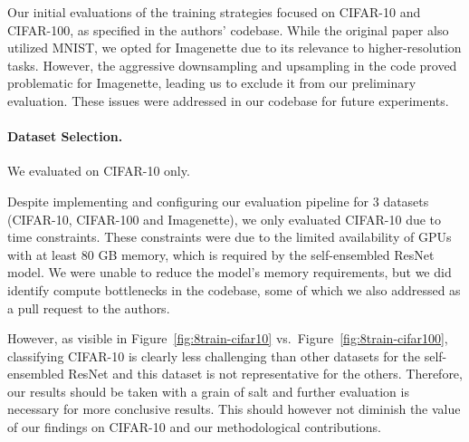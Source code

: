 \documentclass[a4paper, oneside]{discothesis}
\begin{document}
Our initial evaluations of the training strategies focused on CIFAR-10 and CIFAR-100, as specified in the authors' codebase. While the original paper also utilized MNIST, we opted for Imagenette due to its relevance to higher-resolution tasks. However, the aggressive downsampling and upsampling in the code proved problematic for Imagenette, leading us to exclude it from our preliminary evaluation. These issues were addressed in our codebase for future experiments.

\paragraph{Dataset Selection.}

We evaluated on CIFAR-10 only.

Despite implementing and configuring our evaluation pipeline for 3 datasets (CIFAR-10, CIFAR-100 and Imagenette), we only evaluated CIFAR-10 due to time constraints. These constraints were due to the limited availability of GPUs with at least 80 GB memory, which is required by the self-ensembled ResNet model. We were unable to reduce the model's memory requirements, but we did identify compute bottlenecks in the codebase, some of which we also addressed as a pull request to the authors.

However, as visible in Figure~\ref{fig:8train-cifar10} vs.\ Figure~\ref{fig:8train-cifar100}, classifying CIFAR-10 is clearly less challenging than other datasets for the self-ensembled ResNet and this dataset is not representative for the others. Therefore, our results should be taken with a grain of salt and further evaluation is necessary for more conclusive results. This should however not diminish the value of our findings on CIFAR-10 and our methodological contributions.
\end{document}
